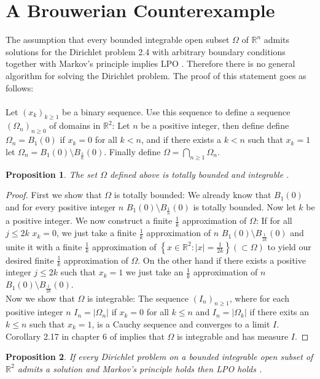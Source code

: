 \documentclass[11pt,a4paper,leqno]{report}
\newtheorem{proposition}{Proposition}[chapter]
\numberwithin{equation}{chapter}
\begin{document}
\section{A Brouwerian Counterexample}
The assumption that every bounded integrable open subset $\Omega$ of $\mathbb{R}^n$ admits solutions for the Dirichlet problem 2.4 with arbitrary boundary conditions together with Markov's principle implies LPO \cite[Theorem 4]{SDPC}. Therefore there is no general algorithm for solving the Dirichlet problem. The proof of this statement goes as follows:\\
\\
Let $(x_k)_{k\geq 1}$ be a binary sequence. Use this sequence to define a sequence $(\Omega_n)_{n\geq 0}$ of domains in $\mathbb{R}^2$: Let $n$ be a positive integer, then define define $\Omega_n=B_1(0)$ if $x_k=0$ for all $k<n$, and if there exists a $k<n$ such that $x_k=1$ let $\Omega_n=B_1(0)\setminus B_\frac{1}{n}(0)$. Finally define $\Omega=\bigcap_{n\geq 1}\Omega_n$. 
\begin{proposition} The set $\Omega$ defined above is totally bounded and integrable \cite{SDPC}.\end{proposition}
\begin{proof}
First we show that $\Omega$ is totally bounded: We already know that $B_1(0)$ and for every positive integer $n$ $B_1(0)\setminus B_\frac{1}{n}(0)$ is totally bounded. Now let $k$ be a positive integer. We now construct a finite $\frac{1}{k}$ approximation of $\Omega$: If for all $j\leq 2k$ $x_k=0$, we just take a finite $\frac{1}{k}$ approximation of $n$ $B_1(0)\setminus B_\frac{1}{2k}(0)$ and unite it with a finite $\frac{1}{k}$ approximation of $\left\{x\in\mathbb{R}^2: |x|=\frac{1}{2k}\right\}(\subset\Omega)$ to yield our desired finite $\frac{1}{k}$ approximation of $\Omega$. On the other hand if there exists a positive integer $j\leq 2k$ such that $x_k=1$ we just take an $\frac{1}{k}$ approximation of $n$ $B_1(0)\setminus B_\frac{1}{2k}(0)$.
\\
Now we show that $\Omega$ is integrable: The sequence $(I_n)_{n\geq 1}$, where for each positive integer $n$ $I_n=|\Omega_n|$ if $x_k=0$ for all $k\leq n$ and $I_n=|\Omega_k|$ if there exits an $k\leq n$ such that $x_k=1$, is a Cauchy sequence and converges to a limit $I$. Corollary 2.17 in chapter 6 of \cite{Wang} implies that $\Omega$ is integrable and has measure $I$.
\end{proof}
\begin{proposition} If every Dirichlet problem on a bounded integrable open subset of $\mathbb{R}^2$ admits a solution and Markov's principle holds then LPO holds \cite{SDPC}.\end{proposition}
\end{document}
